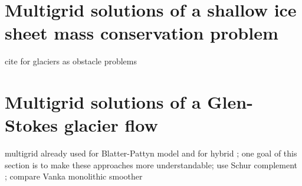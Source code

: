 \documentclass[letterpaper,final,12pt,reqno]{amsart}
\begin{document}
\section{Multigrid solutions of a shallow ice sheet mass conservation problem} \label{sec:sia}

cite for glaciers as obstacle problems \cite{Bueler2016,Bueler2020,Calvoetal2002,JouvetBueler2012}

\section{Multigrid solutions of a Glen-Stokes glacier flow} \label{sec:stokes}

multigrid already used for Blatter-Pattyn model \cite{BrownSmithAhmadia2013} and for hybrid \cite{Jouvetetal2013}; one goal of this section is to make these approaches more understandable; use Schur complement \cite{Bueler2021,Elmanetal2014}; compare Vanka monolithic smoother \cite{Farrelletal2019}

\small

\bigskip


\end{document}
